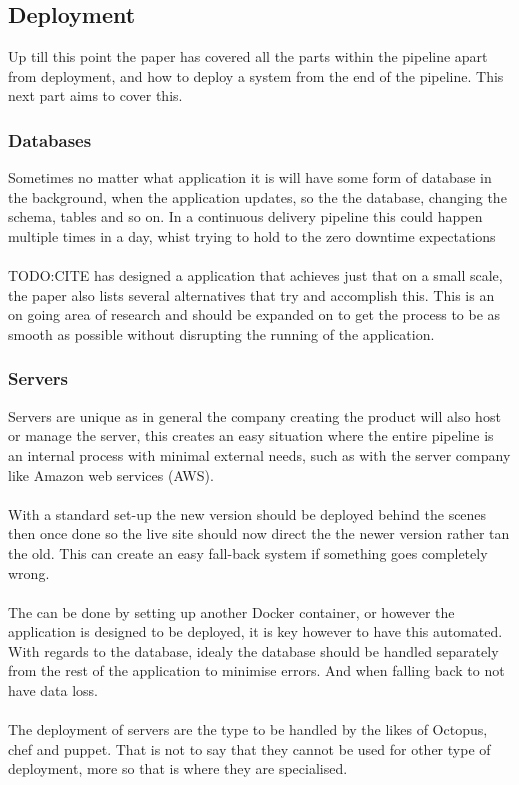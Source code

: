 \subsection{Deployment}

Up till this point the paper has covered all the parts within the pipeline apart from deployment, and how to deploy a system from the end of the pipeline. This next part aims to cover this.

\subsubsection{Databases}
Sometimes no matter what application it is will have some form of database in the background, when the application updates, so the the database, changing the schema, tables and so on. In a continuous delivery pipeline this could happen multiple times in a day, whist trying to hold to the zero downtime expectations
\\\\
TODO:CITE has designed a application that achieves just that on a small scale, the paper also lists several alternatives that try and accomplish this. This is an on going area of research and should be expanded on to get the process to be as smooth as possible without disrupting the running of the application.  

\subsubsection{Servers}

Servers are unique as in general the company creating the product will also host or manage the server, this creates an easy situation where the entire pipeline is an internal process with minimal external needs, such as with the server company like Amazon web services (AWS).
\\\\
With a standard set-up the new version should be deployed behind the scenes then once done so the live site should now direct the the newer version rather tan the old. This can create an easy fall-back system if something goes completely wrong.
\\\\
The can be done by setting up another Docker container, or however the application is designed to be deployed, it is key however to have this automated. With regards to the database, idealy the database should be handled separately from the rest of the application to minimise errors. And when falling back to not have data loss.
\\\\
The deployment of servers are the type to be handled by the likes of Octopus, chef and puppet. That is not to say that they cannot be used for other type of deployment, more so that is where they are specialised.


